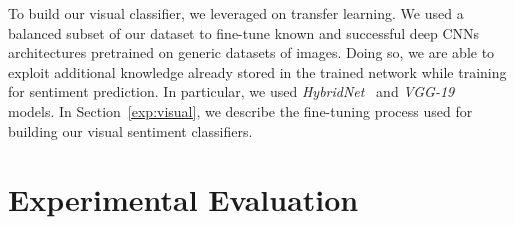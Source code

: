To build our visual classifier, we leveraged on transfer learning. We used  a balanced subset of our dataset {\TSA}
to {fine-tune} known and successful deep CNNs architectures pretrained on generic datasets of images. Doing so, we are able to exploit additional knowledge already stored in the trained network while training for sentiment prediction. In particular, we used \textit{HybridNet}~\cite{zhou2014} and \textit{VGG-19}~\cite{simonyan2014very} models.
In Section~\ref{exp:visual}, we describe the fine-tuning process used for building our visual sentiment classifiers.

\section{Experimental Evaluation}
\label{sec:vsa:experiments}
